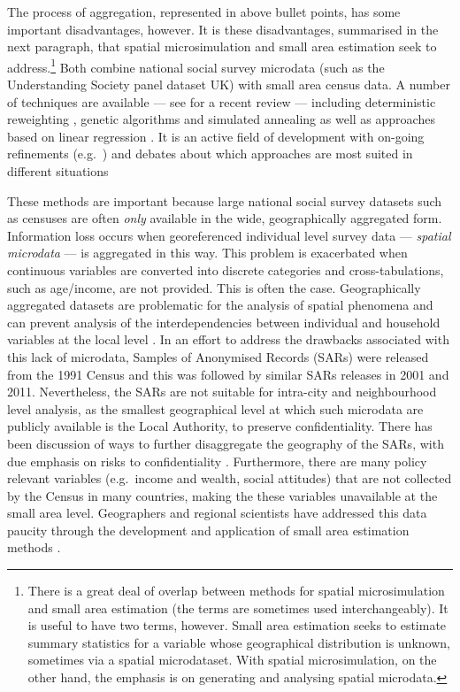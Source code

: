 \documentclass[a4paper,10pt]{article}
\begin{document}
The process of aggregation, represented in above bullet points,
has some important disadvantages, however. It is these disadvantages,
summarised in the next paragraph, that spatial microsimulation and small
area estimation seek to address.\footnote{There
is a great deal of overlap between methods for spatial microsimulation and
small area estimation (the terms are sometimes used 
interchangeably). It is useful
to have two terms, however. Small
area estimation seeks to estimate summary statistics for a variable whose
geographical distribution is unknown, sometimes via a spatial microdataset. With spatial
microsimulation, on the other hand, the emphasis is on generating and analysing
spatial microdata.}
Both combine national social survey microdata
(such as the Understanding Society panel dataset UK) with small area census data.
A number of techniques are available --- see \citet{tanton2014review} for a recent review ---
including deterministic reweighting \citep{Birkin1989a},
genetic algorithms and simulated annealing \citep{Williamson1998}
as well as approaches based on linear regression \citep{Harding2011}.
It is an active field of development with on-going refinements
(e.g.~\citealp{Lovelace2013-trs,Pritchard2012}) and debates
about which approaches are most suited in different situations
\citep{harland2012,Hermes2012a,Smith2009,whitworth2013evaluations,Williamson2013}

These methods are important because large national social survey datasets 
such as censuses are often \emph{only} available in the wide, geographically aggregated
form. Information loss occurs when georeferenced individual level survey data
--- \emph{spatial microdata} --- is aggregated in this way. This
problem is exacerbated when continuous variables
are converted into discrete categories and 
cross-tabulations, such as age/income, are not provided. This is often the case.
Geographically aggregated datasets are
problematic for the analysis of spatial phenomena \citep{Openshaw1984}
and can prevent analysis of the interdependencies between individual and household variables
at the local level \citep{Lee2009}.
In an effort to address the drawbacks associated with this lack of microdata,
Samples of Anonymised Records (SARs) were released from the 1991 Census
\citep{marsh1993,middleton1995samples} and this was followed by similar SARs releases in 2001 and 2011.
Nevertheless, the SARs are not suitable for intra-city and neighbourhood level
analysis, as the smallest geographical level at which such microdata are publicly
available is the Local Authority, to preserve confidentiality.
There has been discussion of ways to further disaggregate the geography
of the SARs, with due emphasis on risks to confidentiality \citep{Tranmer2005case4}.
Furthermore, there are many policy relevant variables (e.g.~income and wealth, social attitudes)
that are not collected by the Census in many countries, making the these variables
unavailable at the small area level.
Geographers and regional scientists have addressed this data paucity through the development
and application of small area estimation methods \citep{Ballas2005c,Hermes2012a}.
\end{document}
